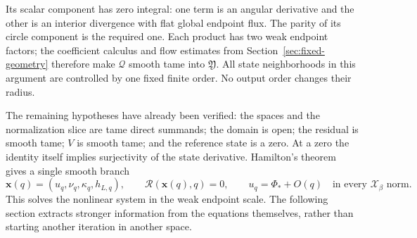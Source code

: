 Its scalar component has zero integral: one term is an angular
derivative and the other is an interior divergence with flat global
endpoint flux. The parity of its circle component is the required
one. Each product has two weak endpoint factors; the coefficient
calculus and flow estimates from Section~\ref{sec:fixed-geometry}
therefore make $\mathcal Q$ smooth tame into $\mathfrak Y$.
All state neighborhoods in this argument are controlled by one fixed
finite order. No output order changes their radius.

The remaining hypotheses have already been verified: the spaces and
the normalization slice are tame direct summands; the domain is open;
the residual is smooth tame; $V$ is smooth tame; and the reference
state is a zero. At a zero the identity itself implies surjectivity
of the state derivative. Hamilton's theorem gives a single smooth
branch
\begin{equation}\label{eq:rewrite-weak-branch}
 \mathbf x(q)=(u_q,\nu_q,\kappa_q,h_{L,q}),\qquad
 \mathcal R(\mathbf x(q),q)=0,\qquad
 u_q=\Phi_*+O(q)\quad\text{in every }\mathcal X_\beta\text{ norm}.
\end{equation}
This solves the nonlinear system in the weak endpoint scale. The
following section extracts stronger information from the equations
themselves, rather than starting another iteration in another space.
